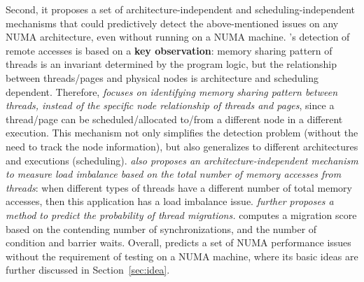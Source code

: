 

Second, it proposes a set of architecture-independent and scheduling-independent mechanisms that could predictively detect the above-mentioned issues on any NUMA architecture, even without running on a NUMA machine. \NP{}'s detection of remote accesses is based on a \textbf{key observation}:  memory sharing pattern of threads is an invariant determined by the program logic, but the relationship between threads/pages and physical nodes is architecture and scheduling dependent. Therefore, \textit{\NP{} focuses on identifying memory sharing pattern between threads, instead of the specific node relationship of threads and pages}, since a thread/page can be scheduled/allocated to/from a different node in a different execution. This mechanism not only simplifies the detection problem (without the need to track the node information), but also generalizes to different architectures and executions (scheduling). \textit{\NP{} also proposes an architecture-independent mechanism to measure load imbalance based on the total number of memory accesses from threads}: when different types of threads have a different number of total memory accesses, then this application has a load imbalance issue. \textit{\NP{} further proposes a method to predict the probability of thread migrations.} \NP{} computes a migration score based on the contending number of synchronizations, and the number of condition and barrier waits. Overall, \NP{} predicts a set of NUMA performance issues without the requirement of testing on a NUMA machine, where its basic ideas are further discussed in Section~\ref{sec:idea}.   




